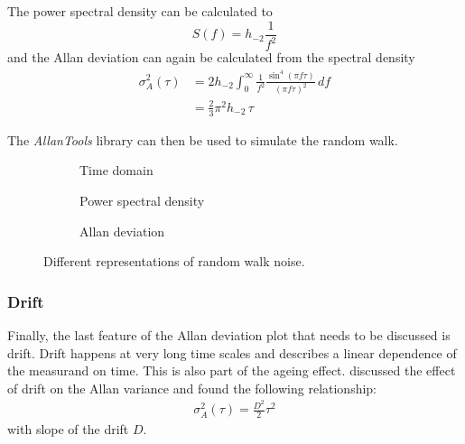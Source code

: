 The power spectral density can be calculated \cite{psd_to_adev,noise_generation} to
\begin{equation}
    S(f) = h_{-2} \frac{1}{f^2}
\end{equation}
and the Allan deviation can again be calculated from the spectral density
\begin{align}
    \sigma_A^2(\tau) &= 2 h_{-2} \int_0^\infty \frac{1}{f^2} \frac{\sin^4\left( \pi f \tau \right)}{(\pi f \tau)^2}\,df \nonumber\\
    &=\frac{2}{3} \pi^2 h_{-2}\, \tau
\end{align}

The \textit{AllanTools} library \cite{allantools} can then be used to simulate the random walk.

\begin{figure}[ht]
    \centering
    \begin{subfigure}{0.32\linewidth}
        \centering
        \scalebox{0.75}{%
            
        } %
        \caption{Time domain}
        \label{fig:random_walk_time}
    \end{subfigure}
    \begin{subfigure}{0.32\linewidth}
        \centering
        \scalebox{0.75}{%
            
        } %
        \caption{Power spectral density}
        \label{fig:random_walk_psd}
    \end{subfigure}
    \begin{subfigure}{0.32\linewidth}
        \centering
        \scalebox{0.75}{%
            
        } %
        \caption{Allan deviation}
        \label{fig:random_walk_adev}
    \end{subfigure}
    \caption{Different representations of random walk noise.}
    \label{fig:random_walk_noise_simulated}
\end{figure}


\clearpage
\subsubsection{Drift}
Finally, the last feature of the Allan deviation plot that needs to be discussed is drift. Drift happens at very long time scales and describes a linear dependence of the measurand on time. This is also part of the ageing effect. \citeauthor{adev_drift} discussed the effect of drift \cite{adev_drift} on the Allan variance and found the following relationship:
\begin{align}
    \sigma_A^2(\tau) = \frac{D^2}{2} \tau^2
\end{align}
with slope of the drift $D$.

